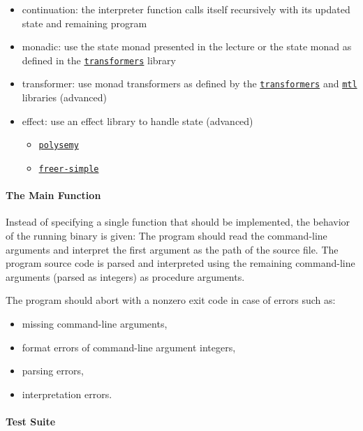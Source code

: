 \documentclass{article}
\begin{document}
\begin{itemize}
\item continuation: the interpreter function calls itself recursively with its updated state and remaining program
\item monadic: use the state monad presented in the lecture or the state monad as defined in the \href{https://hackage.haskell.org/package/transformers}{\texttt{transformers}} library
\item transformer: use monad transformers as defined by the \href{https://hackage.haskell.org/package/transformers}{\texttt{transformers}} and \href{https://hackage.haskell.org/package/mtl}{\texttt{mtl}} libraries (advanced)
\item effect: use an effect library to handle state (advanced)
    \begin{itemize}
    \item \href{https://hackage.haskell.org/package/polysemy}{\texttt{polysemy}}
    \item \href{https://hackage.haskell.org/package/freer-simple}{\texttt{freer-simple}}
    \end{itemize}
\end{itemize}

\paragraph{The Main Function}

Instead of specifying a single function that should be implemented, the behavior of the running binary is given: The program should read the command-line arguments and interpret the first argument as the path of the source file. The program source code is parsed and interpreted using the remaining command-line arguments (parsed as integers) as procedure arguments.

The program should abort with a nonzero exit code in case of errors such as:

\begin{itemize}
\item missing command-line arguments,
\item format errors of command-line argument integers,
\item parsing errors,
\item interpretation errors.
\end{itemize}

\paragraph{Test Suite}
\end{document}
